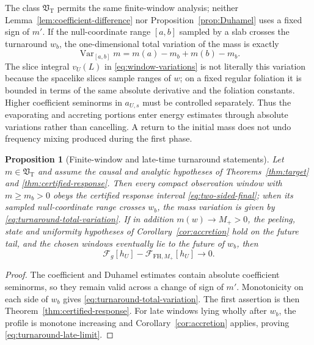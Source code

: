 \documentclass[11pt,a4paper]{article}
\newtheorem{proposition}[theorem]{Proposition}
\theoremstyle{definition}
\theoremstyle{remark}
\begin{document}
	The class $\mathfrak V_{\mathrm T}$ permits the same finite-window analysis;
	neither Lemma~\ref{lem:coefficient-difference} nor Proposition~\ref{prop:Duhamel}
	uses a fixed sign of $m'$.  If the null-coordinate range $[a,b]$ sampled by
	a slab crosses the turnaround $w_b$, the one-dimensional total variation of
	the mass is exactly
	\begin{equation}
		\operatorname{Var}_{[a,b]}m=m(a)-m_b+m(b)-m_b.
		\label{eq:turnaround-total-variation}
	\end{equation}
	The slice integral $v_U(L)$ in \eqref{eq:window-variations} is not literally
	this variation because the spacelike slices sample ranges of $w$; on a fixed
	regular foliation it is bounded in terms of the same absolute derivative and
	the foliation constants.  Higher coefficient seminorms in $a_{U,s}$ must be
	controlled separately.  Thus the evaporating and accreting portions enter
	energy estimates through absolute variations rather than cancelling.  A
	return to the initial mass does not undo frequency mixing produced during the
	first phase.
	
	\begin{proposition}[Finite-window and late-time turnaround statements]
		\label{prop:turnaround}
		Let $m\in\mathfrak V_{\mathrm T}$ and assume the causal and analytic
		hypotheses of Theorems~\ref{thm:target} and
		\ref{thm:certified-response}.  Then every compact observation window with
		$m\geq m_b>0$ obeys the certified response interval
		\eqref{eq:two-sided-final}; when its sampled null-coordinate range crosses
		$w_b$, the mass variation is given by
		\eqref{eq:turnaround-total-variation}.  If in
		addition $m(w)\to M_+>0$, the peeling, state and uniformity hypotheses of
		Corollary~\ref{cor:accretion} hold on the future tail, and the chosen windows
		eventually lie to the future of $w_b$, then
		\begin{equation}
			\mathcal F_g[h_U]-\mathcal F_{\mathrm{FH},M_+}[h_U]\longrightarrow0.
			\label{eq:turnaround-late-limit}
		\end{equation}
	\end{proposition}
	
	\begin{proof}
		The coefficient and Duhamel estimates contain absolute coefficient
		seminorms, so they remain valid across a change of sign of $m'$.  Monotonicity on each side of $w_b$
		gives \eqref{eq:turnaround-total-variation}.  The first assertion is then
		Theorem~\ref{thm:certified-response}.  For late windows lying wholly after
		$w_b$, the profile is monotone increasing and Corollary~\ref{cor:accretion}
		applies, proving \eqref{eq:turnaround-late-limit}.
	\end{proof}
	
\end{document}
